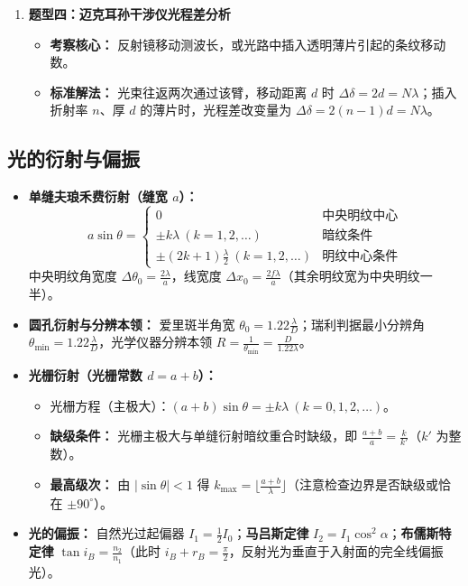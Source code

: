 \documentclass[zihao=5,a4paper,UTF8]{ctexart}
\begin{document}
\begin{typebox}[光的干涉常见题型分析]
\begin{enumerate}
\begin{itemize}
    \end{itemize}
    \item \textbf{题型四：迈克耳孙干涉仪光程差分析}
    \begin{itemize}
        \item \textbf{考察核心：} 反射镜移动测波长，或光路中插入透明薄片引起的条纹移动数。
        \item \textbf{标准解法：} 光束往返两次通过该臂，移动距离 $d$ 时 $\Delta\delta = 2d = N\lambda$；插入折射率 $n$、厚 $d$ 的薄片时，光程差改变量为 $\Delta\delta = 2(n-1)d = N\lambda$。
    \end{itemize}
\end{enumerate}
\end{typebox}

\subsection{光的衍射与偏振}

\begin{formulabox}[光的衍射与偏振核心公式]
\begin{itemize}
    \item \textbf{单缝夫琅禾费衍射（缝宽 $a$）：}
    \[
        a\sin\theta = \begin{cases} 0 & \text{中央明纹中心}\\ \pm k\lambda\ (k=1,2,\dots) & \text{暗纹条件}\\ \pm(2k+1)\frac{\lambda}{2}\ (k=1,2,\dots) & \text{明纹中心条件} \end{cases}
    \]
    中央明纹角宽度 $\Delta\theta_0 = \frac{2\lambda}{a}$，线宽度 $\Delta x_0 = \frac{2f\lambda}{a}$（其余明纹宽为中央明纹一半）。
    \item \textbf{圆孔衍射与分辨本领：} 爱里斑半角宽 $\theta_0 = 1.22\frac{\lambda}{D}$；瑞利判据最小分辨角 $\theta_{\min} = 1.22\frac{\lambda}{D}$，光学仪器分辨本领 $R = \frac{1}{\theta_{\min}} = \frac{D}{1.22\lambda}$。
    \item \textbf{光栅衍射（光栅常数 $d = a+b$）：}
    \begin{itemize}
        \item 光栅方程（主极大）：$(a+b)\sin\theta = \pm k\lambda\ (k=0,1,2,\dots)$。
        \item \textbf{缺级条件：} 光栅主极大与单缝衍射暗纹重合时缺级，即 $\frac{a+b}{a} = \frac{k}{k'}$（$k'$ 为整数）。
        \item \textbf{最高级次：} 由 $|\sin\theta| < 1$ 得 $k_{\max} = \lfloor \frac{a+b}{\lambda} \rfloor$（注意检查边界是否缺级或恰在 $\pm 90^\circ$）。
    \end{itemize}
    \item \textbf{光的偏振：} 自然光过起偏器 $I_1 = \frac{1}{2}I_0$；\textbf{马吕斯定律} $I_2 = I_1\cos^2\alpha$；\textbf{布儒斯特定律} $\tan i_B = \frac{n_2}{n_1}$（此时 $i_B + r_B = \frac{\pi}{2}$，反射光为垂直于入射面的完全线偏振光）。
\end{itemize}
\end{formulabox}
\end{document}
